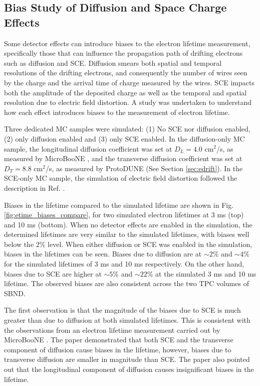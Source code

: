 \subsection{Bias Study of Diffusion and Space Charge Effects}
\label{sec7:etime_bias}

Some detector effects can introduce biases to the electron lifetime measurement, specifically those that can influence the propagation path of drifting electrons such as diffusion and SCE.
Diffusion smears both spatial and temporal resolutions of the drifting electrons, and consequently the number of wires seen by the charge and the arrival time of charge measured by the wires.
SCE impacts both the amplitude of the deposited charge as well as the temporal and spatial resolution due to electric field distortion.
A study was undertaken to understand how each effect introduces biases to the measurement of electron lifetime.

Three dedicated MC samples were simulated: (1) No SCE nor diffusion enabled, (2) only diffusion enabled and (3) only SCE enabled.
In the diffusion-only MC sample, the longitudinal diffusion coefficient was set at $D_{L} = 4.0 $ cm$^{2}$/s, as measured by MicroBooNE \cite{uboone_diff}, and the transverse diffusion coefficient was set at $D_T = 8.8 $ cm$^{2}$/s, as measured by ProtoDUNE \cite{protodune} (See Section \ref{sec:edrift}).     
In the SCE-only MC sample, the simulation of electric field distortion followed the description in Ref. \cite{SCE}.

Biases in the lifetime compared to the simulated lifetime are shown in Fig. \ref{fig:etime_biases_compare}, for two simulated electron lifetimes at 3 ms (top) and 10 ms (bottom).
When no detector effects are enabled in the simulation, the determined lifetimes are very similar to the simulated lifetimes, with biases well below the 2\% level.
When either diffusion or SCE was enabled in the simulation, biases in the lifetimes can be seen.
Biases due to diffusion are at $\sim 2\%$ and $\sim 4\%$ for the simulated lifetimes of 3 ms and 10 ms respectively.
On the other hand, biases due to SCE are higher at $\sim 5 \%$ and $\sim22 \%$ at the simulated 3 ms and 10 ms lifetime.
The observed biases are also consistent across the two TPC volumes of SBND.

The first observation is that the magnitude of the biases due to SCE is much greater than due to diffusion at both simulated lifetimes.
This is consistent with the observations from an electron lifetime measurement carried out by MicroBooNE \cite{ubooneEtime}. 
The paper demonstrated that both SCE and the transverse component of diffusion cause biases in the lifetime, however, biases due to transverse diffusion are smaller in magnitude than SCE.
The paper also pointed out that the longitudinal component of diffusion causes insignificant biases in the lifetime.


